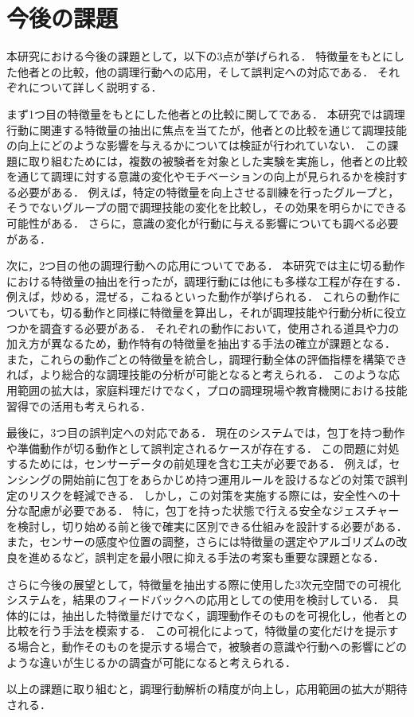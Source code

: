 \section{今後の課題}
本研究における今後の課題として，以下の3点が挙げられる．
特徴量をもとにした他者との比較，他の調理行動への応用，そして誤判定への対応である．
それぞれについて詳しく説明する．

まず1つ目の特徴量をもとにした他者との比較に関してである．
本研究では調理行動に関連する特徴量の抽出に焦点を当てたが，他者との比較を通じて調理技能の向上にどのような影響を与えるかについては検証が行われていない．
この課題に取り組むためには，複数の被験者を対象とした実験を実施し，他者との比較を通じて調理に対する意識の変化やモチベーションの向上が見られるかを検討する必要がある．
例えば，特定の特徴量を向上させる訓練を行ったグループと，そうでないグループの間で調理技能の変化を比較し，その効果を明らかにできる可能性がある．
さらに，意識の変化が行動に与える影響についても調べる必要がある．

次に，2つ目の他の調理行動への応用についてである．
本研究では主に切る動作における特徴量の抽出を行ったが，調理行動には他にも多様な工程が存在する．
例えば，炒める，混ぜる，こねるといった動作が挙げられる．
これらの動作についても，切る動作と同様に特徴量を算出し，それが調理技能や行動分析に役立つかを調査する必要がある．
それぞれの動作において，使用される道具や力の加え方が異なるため，動作特有の特徴量を抽出する手法の確立が課題となる．
また，これらの動作ごとの特徴量を統合し，調理行動全体の評価指標を構築できれば，より総合的な調理技能の分析が可能となると考えられる．
このような応用範囲の拡大は，家庭料理だけでなく，プロの調理現場や教育機関における技能習得での活用も考えられる．

最後に，3つ目の誤判定への対応である．
現在のシステムでは，包丁を持つ動作や準備動作が切る動作として誤判定されるケースが存在する．
この問題に対処するためには，センサーデータの前処理を含む工夫が必要である．
例えば，センシングの開始前に包丁をあらかじめ持つ運用ルールを設けるなどの対策で誤判定のリスクを軽減できる．
しかし，この対策を実施する際には，安全性への十分な配慮が必要である．
特に，包丁を持った状態で行える安全なジェスチャーを検討し，切り始める前と後で確実に区別できる仕組みを設計する必要がある．
また，センサーの感度や位置の調整，さらには特徴量の選定やアルゴリズムの改良を進めるなど，誤判定を最小限に抑える手法の考案も重要な課題となる．

さらに今後の展望として，特徴量を抽出する際に使用した3次元空間での可視化システムを，結果のフィードバックへの応用としての使用を検討している．
具体的には，抽出した特徴量だけでなく，調理動作そのものを可視化し，他者との比較を行う手法を模索する．
この可視化によって，特徴量の変化だけを提示する場合と，動作そのものを提示する場合で，被験者の意識や行動への影響にどのような違いが生じるかの調査が可能になると考えられる．

以上の課題に取り組むと，調理行動解析の精度が向上し，応用範囲の拡大が期待される．